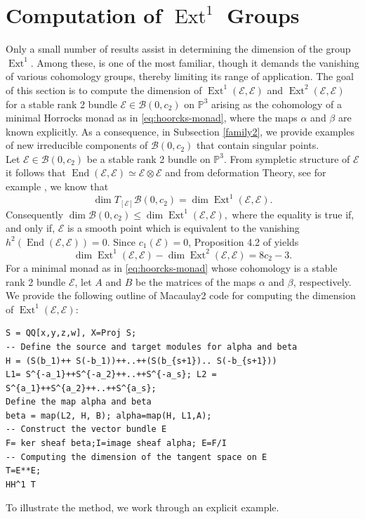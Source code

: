\documentclass[twoside,reqno]{amsart}
\theoremstyle{plain}
\DeclareMathOperator{\End}{End}
\DeclareMathOperator{\Ext}{Ext}
\newcommand{\E}{\mathcal{E}}
\begin{document}
\section{Computation of $\Ext^1$ Groups}\label{section-ext}
\indent Only a small number of results assist in determining the dimension of the group $\Ext^1$. Among 
these, \cite[Lemma 4.1.7]{Okonek} is one of the most familiar, though it demands the vanishing of various cohomology 
groups, thereby limiting its range of application. The goal of this section is to compute the dimension 
of $\Ext^1(\E,\E)$ and $\Ext^2(\E,\E)$ for a stable rank 2 bundle $\E\in\mathcal{B}(0,c_2)$ on 
$\mathbb{P}^3$ arising as the cohomology of a minimal Horrocks monad as in \eqref{eq:hoorcks-monad}, where the maps 
$\alpha$ and $\beta$ are known explicitly.  As a consequence, in Subsection \ref{family2}, we provide examples 
of new irreducible components of $\mathcal{B}(0,c_2)$ that contain singular points.\\
Let $\E\in\mathcal{B}(0,c_2)$ be a stable rank 2 bundle on $\mathbb{P}^3$. From sympletic structure of $\E$ it follows that $\End(\E,\E)\simeq \E\otimes\E$ and from deformation Theory, see for example \cite{Sernesi}, we know that 
$$\dim T_{[\E]}\mathcal{B}(0,c_2)=\dim\Ext^1(\E,\E).$$
Consequently $\dim\mathcal{B}(0,c_2)\leq\dim\Ext^1(\E,\E),$ where the equality is true if, and only if, $\E$ is 
a smooth point which is equivalent to the vanishing $h^2(\End(\E,\E))=0$. Since $c_1(\E)=0$, Proposition 4.2 of \cite{H78} yields
$$\dim \Ext^1(\E,\E)-\dim\Ext^2(\E,\E)=8c_2-3.$$
For a minimal monad as in \eqref{eq:hoorcks-monad} whose cohomology is a stable rank 2 bundle $\E$, let $A$ and $B$ be the 
matrices of the maps $\alpha$ and $\beta$, respectively. We provide the following outline of 
Macaulay2 code for computing the dimension of $\Ext^1(\E,\E)$: 
\begin{lstlisting}[language=Macaulay2]
S = QQ[x,y,z,w], X=Proj S;
-- Define the source and target modules for alpha and beta
H = (S(b_1)++ S(-b_1))++..++(S(b_{s+1}).. S(-b_{s+1}))
L1= S^{-a_1}++S^{-a_2}++..++S^{-a_s}; L2 = S^{a_1}++S^{a_2}++..++S^{a_s};
Define the map alpha and beta
beta = map(L2, H, B); alpha=map(H, L1,A);
-- Construct the vector bundle E
F= ker sheaf beta;I=image sheaf alpha; E=F/I
-- Computing the dimension of the tangent space on E
T=E**E;
HH^1 T
\end{lstlisting}
To illustrate the method, we work through an explicit example.
\end{document}
